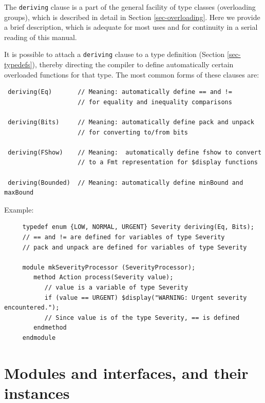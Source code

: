 \documentclass[twoside,letterpaper]{article}
\begin{document}
\label{sec-deriving-brief}


The \texttt{deriving} clause is a part of the general facility of type
classes (overloading groups), which is described in detail in Section
\ref{sec-overloading}.
Here we provide a brief description, which is adequate for most uses
and for continuity in a serial reading of this manual.

It is possible to attach a \texttt{deriving} clause to a type definition
(Section \ref{sec-typedefs}), thereby directing the compiler to define
automatically certain overloaded functions for that type.  The most
common forms of these clauses are:
\begin{verbatim}
 deriving(Eq)       // Meaning: automatically define == and !=
                    // for equality and inequality comparisons

 deriving(Bits)     // Meaning: automatically define pack and unpack
                    // for converting to/from bits

 deriving(FShow)    // Meaning:  automatically define fshow to convert 
                    // to a Fmt representation for $display functions

 deriving(Bounded)  // Meaning: automatically define minBound and maxBound
\end{verbatim}

Example:
\begin{verbatim}
     typedef enum {LOW, NORMAL, URGENT} Severity deriving(Eq, Bits);
     // == and != are defined for variables of type Severity
     // pack and unpack are defined for variables of type Severity 

     module mkSeverityProcessor (SeverityProcessor);
        method Action process(Severity value);
           // value is a variable of type Severity
           if (value == URGENT) $display("WARNING: Urgent severity encountered.");
           // Since value is of the type Severity, == is defined
        endmethod
     endmodule
\end{verbatim}

\section{Modules and interfaces, and their instances}

\label{sec-modules-interfaces}
\end{document}
